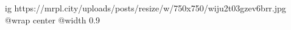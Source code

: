  
 
 
 
 

\ifcmt
  ig https://mrpl.city/uploads/posts/resize/w/750x750/wiju2t03gzev6brr.jpg
  @wrap center
  @width 0.9
\fi
